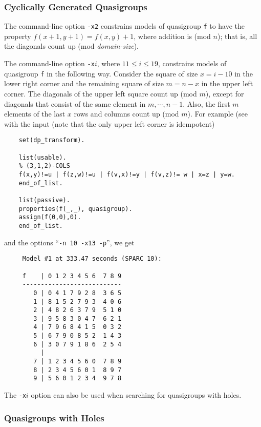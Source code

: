 \subsubsection{Cyclically Generated Quasigroups}

The command-line option \verb:-x2: constrains models of quasigroup \verb:f:
to have the property $f(x+1,y+1)=f(x,y)+1$, where addition is (mod $n$); 
that is, all the diagonals count up (mod {\em domain-size}).

The command-line option \verb:-x:$i$, where $11\leq i \leq 19$,
constrains models of quasigroup \verb:f: in the following way.
Consider the square of size $x=i-10$ in the lower right corner and the
remaining square of size $m=n-x$ in the upper left corner.  The
diagonals of the upper left square count up (mod $m$), except for
diagonals that consist of the same element in $m,\cdots,n-1$.  Also,
the first $m$ elements of the last $x$ rows and columns count up (mod
$m$).  For example (see \cite[Example 8.1]{qg-survey} with the input
(note that the only upper left corner is idempotent)

{\small \begin{verbatim}
    set(dp_transform).

    list(usable).
    % (3,1,2)-COLS
    f(x,y)!=u | f(z,w)!=u | f(v,x)!=y | f(v,z)!= w | x=z | y=w.
    end_of_list.

    list(passive).
    properties(f(_,_), quasigroup).
    assign(f(0,0),0).
    end_of_list.
\end{verbatim}} \noindent
and the options ``\verb:-n 10 -x13 -p:'', we get
{\small \begin{verbatim}
     Model #1 at 333.47 seconds (SPARC 10):

     f    | 0 1 2 3 4 5 6  7 8 9
     ---------------------------
        0 | 0 4 1 7 9 2 8  3 6 5
        1 | 8 1 5 2 7 9 3  4 0 6
        2 | 4 8 2 6 3 7 9  5 1 0
        3 | 9 5 8 3 0 4 7  6 2 1
        4 | 7 9 6 8 4 1 5  0 3 2
        5 | 6 7 9 0 8 5 2  1 4 3
        6 | 3 0 7 9 1 8 6  2 5 4
          |
        7 | 1 2 3 4 5 6 0  7 8 9
        8 | 2 3 4 5 6 0 1  8 9 7
        9 | 5 6 0 1 2 3 4  9 7 8
\end{verbatim}} \noindent
The \verb:-x:$i$ option can also be used when searching for
quasigroups with holes.

\subsubsection{Quasigroups with Holes} \label{holey}

